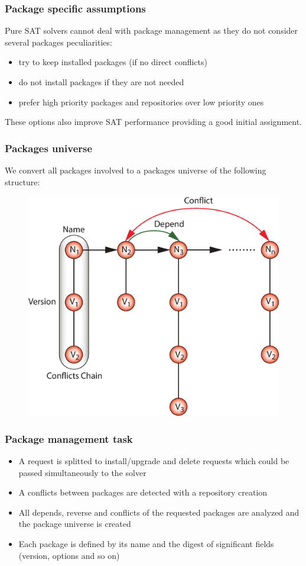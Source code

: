 \documentclass{beamer}
\begin{document}
\begin{frame}
\frametitle{Package specific assumptions}
Pure SAT solvers cannot deal with package management as they do not consider
several packages peculiarities:
\begin{itemize}
  \item try to keep installed packages (if no direct conflicts)
  \item do not install packages if they are not needed
  \item prefer high priority packages and repositories over low priority ones
\end{itemize}
These options also improve SAT performance providing a good initial assignment.
\end{frame}

\begin{frame}
\frametitle{Packages universe}
We convert all packages involved to a packages universe of the following
structure:
\begin{figure}[h!]
  \centering
  \includegraphics[height=0.7\textheight]{q5.eps}
\end{figure}
\end{frame}

\begin{frame}
\frametitle{Package management task}
\begin{itemize}
  \item A request is splitted to install/upgrade and delete requests which
  could be passed simultaneously to the solver
  \item A conflicts between packages are detected with a repository creation
  \item All depends, reverse and conflicts of the requested packages are
  analyzed and the package universe is created
  \item Each package is defined by its name and the digest of significant
  fields (version, options and so on)
\end{itemize}
\end{frame}
\end{document}
